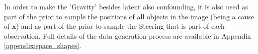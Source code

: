 \documentclass{report}
\newcommand{\bx}{\mathbf{x}}
\begin{document}
In order to make the 'Gravity' besides latent also confounding, it is also used as part of the prior to sample the positions of all objects in the image (being a cause of $\bx$) and as part of the prior to sample the Steering that is part of each observation. Full details of the data generation process are available in Appendix \ref{appendix:space_shapes}.





\end{document}
